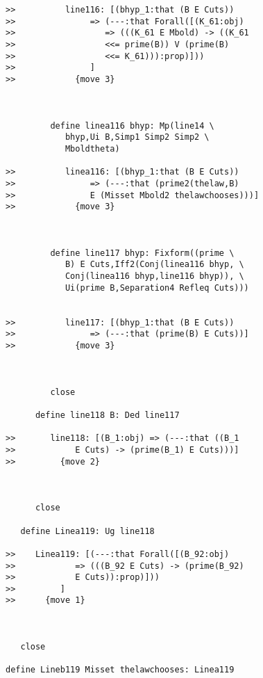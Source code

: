 \documentclass[12pt]{article}
\begin{document}
\begin{verbatim}
>>          line116: [(bhyp_1:that (B E Cuts))
>>               => (---:that Forall([(K_61:obj)
>>                  => (((K_61 E Mbold) -> ((K_61
>>                  <<= prime(B)) V (prime(B)
>>                  <<= K_61))):prop)]))
>>               ]
>>            {move 3}



         define linea116 bhyp: Mp(line14 \
            bhyp,Ui B,Simp1 Simp2 Simp2 \
            Mboldtheta)

>>          linea116: [(bhyp_1:that (B E Cuts))
>>               => (---:that (prime2(thelaw,B)
>>               E (Misset Mbold2 thelawchooses)))]
>>            {move 3}



         define line117 bhyp: Fixform((prime \
            B) E Cuts,Iff2(Conj(linea116 bhyp, \
            Conj(linea116 bhyp,line116 bhyp)), \
            Ui(prime B,Separation4 Refleq Cuts)))


>>          line117: [(bhyp_1:that (B E Cuts))
>>               => (---:that (prime(B) E Cuts))]
>>            {move 3}



         close

      define line118 B: Ded line117

>>       line118: [(B_1:obj) => (---:that ((B_1
>>            E Cuts) -> (prime(B_1) E Cuts)))]
>>         {move 2}



      close

   define Linea119: Ug line118

>>    Linea119: [(---:that Forall([(B_92:obj)
>>            => (((B_92 E Cuts) -> (prime(B_92)
>>            E Cuts)):prop)]))
>>         ]
>>      {move 1}



   close

define Lineb119 Misset thelawchooses: Linea119



\end{verbatim}
\end{document}
